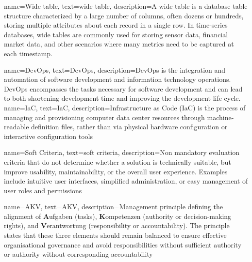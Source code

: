 {
    name={Wide table},
    text={wide table},
    description={A wide table is a database table structure characterized by a large number of columns, often dozens or hundreds, storing multiple attributes about each record in a single row. In time-series databases, wide tables are commonly used for storing sensor data, financial market data, and other scenarios where many metrics need to be captured at each timestamp.}
}


{
    name={DevOps},
    text={DevOps},
    description={DevOps is the integration and automation of software development and information technology operations. DevOps encompasses the tasks necessary for software development and can lead to both shortening development time and improving the development life cycle.}
}
{
    name={IaC},
    text={IaC},
    description={Infrastructure as Code (IaC) is the process of managing and provisioning computer data center resources through machine-readable definition files, rather than via physical hardware configuration or interactive configuration tools}
}

{
    name={Soft Criteria},
    text={soft criteria},
    description={Non mandatory evaluation criteria that do not determine whether a solution is technically suitable, but improve usability, maintainability, or the overall user experience. Examples include intuitive user interfaces, simplified administration, or easy management of user roles and permissions}
}

{
    name={AKV},
    text={AKV},
    description={Management principle defining the alignment of \textbf{A}ufgaben (tasks), \textbf{K}ompetenzen (authority or decision-making rights), and \textbf{V}erantwortung (responsibility or accountability). The principle states that these three elements should remain balanced to ensure effective organisational governance and avoid responsibilities without sufficient authority or authority without corresponding accountability}
}